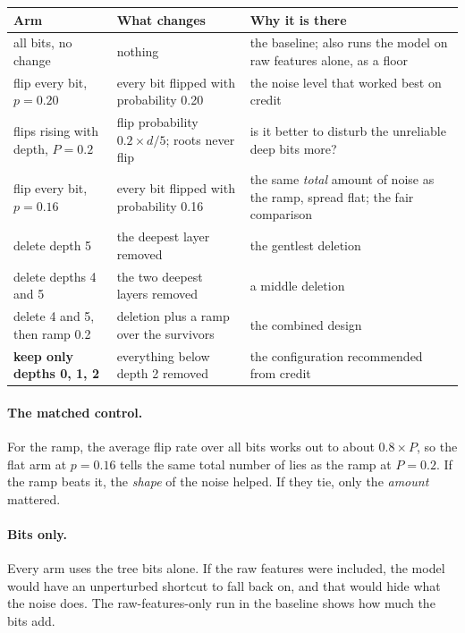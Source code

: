 \documentclass[11pt,a4paper]{article}
\begin{document}
\begin{table}[H]\centering\small
\begin{tabular}{p{3.9cm}p{4.9cm}p{6.6cm}}
\toprule
\textbf{Arm} & \textbf{What changes} & \textbf{Why it is there}\\
\midrule
all bits, no change & nothing & the baseline; also runs the model on raw features alone, as a floor\\
flip every bit, $p = 0.20$ & every bit flipped with probability 0.20 & the noise level that worked best on credit\\
flips rising with depth, $P = 0.2$ & flip probability $0.2 \times d / 5$; roots never flip & is it better to disturb the unreliable deep bits more?\\
flip every bit, $p = 0.16$ & every bit flipped with probability 0.16 & the same \emph{total} amount of noise as the ramp, spread flat; the fair comparison\\
delete depth 5 & the deepest layer removed & the gentlest deletion\\
delete depths 4 and 5 & the two deepest layers removed & a middle deletion\\
delete 4 and 5, then ramp 0.2 & deletion plus a ramp over the survivors & the combined design\\
\textbf{keep only depths 0, 1, 2} & everything below depth 2 removed & the configuration recommended from credit\\
\bottomrule
\end{tabular}
\end{table}

\paragraph{The matched control.} For the ramp, the average flip rate over all
bits works out to about $0.8 \times P$, so the flat arm at $p = 0.16$ tells
the same total number of lies as the ramp at $P = 0.2$. If the ramp beats it,
the \emph{shape} of the noise helped. If they tie, only the \emph{amount}
mattered.

\paragraph{Bits only.} Every arm uses the tree bits alone. If the raw features
were included, the model would have an unperturbed shortcut to fall back on,
and that would hide what the noise does. The raw-features-only run in the
baseline shows how much the bits add.
\end{document}
